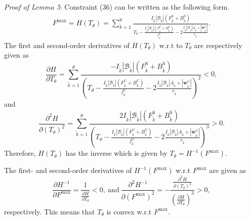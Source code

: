 \documentclass[10pt,journal,transmag]{IEEEtran}
\begin{document}
\begin{appendices}
\section{}
\label{appendix:proof of lemma 3}
\textit{Proof of Lemma 5}: Constraint (36) can be written as the following form.
    \begin{align}
        F^\text{max}= H(T_\theta) = \sum^{\theta}_{\tilde{k}=1} \frac{I_{\tilde{k}} \left|\mathcal{B}_{\tilde{k}}\right| (F^\text{S}_{\tilde{k}} + B^\text{S}_{\tilde{k}}) }{ T_\theta- \frac{ I_{\tilde{k}} \left|\mathcal{B}_{\tilde{k}}\right| (F^\text{C}_{\tilde{k}} + B^\text{C}_{\tilde{k}}) }{ f^\text{C}_{\tilde{k}} } - 2 \frac{I_{\tilde{k}} \left|\mathcal{B}_{\tilde{k}}\right| \Lambda_{\tilde{k}} + |\textbf{w}^\text{C}_{\tilde{k}}|}{r_{\tilde{k}}} }. \label{function H representation about mathcal T}
    \end{align}
The first and second-order derivatives of $H(T_\theta)$ w.r.t to $T_\theta$ are respectively given as
\begin{equation}
    \frac{\partial H }{\partial T_\theta} = \sum^{\theta}_{\tilde{k}=1} \frac{ - I_{\tilde{k}} \left|\mathcal{B}_{\tilde{k}}\right| (F^\text{S}_{\tilde{k}} + B^\text{S}_{\tilde{k}}) }{ \left( T_\theta - \frac{ I_{\tilde{k}} \left|\mathcal{B}_{\tilde{k}}\right| (F^\text{C}_{\tilde{k}} + B^\text{C}_{\tilde{k}}) }{ f^\text{C}_{\tilde{k}} } - 2 \frac{I_{\tilde{k}} \left|\mathcal{B}_{\tilde{k}}\right| \Lambda_{\tilde{k}} + |\textbf{w}^\text{C}_{\tilde{k}}|}{r_{{\tilde{k}}}} \right)^2 }<0,
    \end{equation}
and
\begin{equation}
    \frac{\partial^2 H }{ {\partial (T_\theta)}^2 } = \sum^{\theta}_{{\tilde{k}}=1} \frac{ 2 I_{\tilde{k}} \left|\mathcal{B}_{\tilde{k}}\right| (F^\text{S}_{\tilde{k}} + B^\text{S}_{\tilde{k}}) }{ \left( T_\theta - \frac{ I_{\tilde{k}} \left|\mathcal{B}_{\tilde{k}}\right| (F^\text{C}_{\tilde{k}} + B^\text{C}_{\tilde{k}}) }{ f^\text{C}_{\tilde{k}} } - 2 \frac{I_{\tilde{k}} \left|\mathcal{B}_{\tilde{k}}\right| \Lambda_{\tilde{k}} + |\textbf{w}^\text{C}_{\tilde{k}}|}{r_{{\tilde{k}}}} \right)^3 }>0.
\end{equation}
Therefore, $H(T_\theta)$ has the inverse which is given by $T_\theta = H^{-1}(F^\text{max})$.

The first- and second-order derivatives of $H^{-1}(F^\text{max})$ w.r.t $F^\text{max}$ are given as
\begin{equation}
    \frac{\partial H^{-1} }{\partial F^\text{max} } = \frac{1}{\frac{\partial H }{\partial T_\theta}} < 0,\ \text{and}\ \frac{\partial^2 H^{-1} }{ {\partial (F^\text{max})}^2 } = -\frac{\frac{\partial^2 H }{ {\partial (T_\theta)}^2 }}{{\left(\frac{\partial H }{\partial T_\theta}\right)}^3} > 0,
\end{equation}
respectively. This means that $T_\theta$ is convex w.r.t $F^\text{max}$.

\end{appendices}
\end{document}
